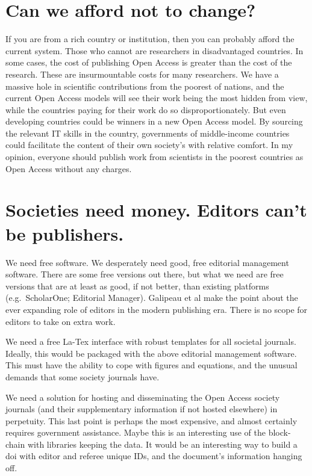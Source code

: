 \documentclass[
]{krantz}
\begin{document}
\hypertarget{can-we-afford-not-to-change}{%
\section{Can we afford not to change?}\label{can-we-afford-not-to-change}}

If you are from a rich country or institution, then you can probably afford the current system. Those who cannot are researchers in disadvantaged countries. In some cases, the cost of publishing Open Access is greater than the cost of the research. These are insurmountable costs for many researchers. We have a massive hole in scientific contributions from the poorest of nations, and the current Open Access models will see their work being the most hidden from view, while the countries paying for their work do so disproportionately. But even developing countries could be winners in a new Open Access model. By sourcing the relevant IT skills in the country, governments of middle-income countries could facilitate the content of their own society's with relative comfort. In my opinion, everyone should publish work from scientists in the poorest countries as Open Access without any charges.

\hypertarget{societies-need-money.-editors-cant-be-publishers.}{%
\section{Societies need money. Editors can't be publishers.}\label{societies-need-money.-editors-cant-be-publishers.}}

We need free software. We desperately need good, free editorial management software. There are some free versions out there, but what we need are free versions that are at least as good, if not better, than existing platforms (e.g.~ScholarOne; Editorial Manager). Galipeau et al \citeyearpar{galipeau2016scoping} make the point about the ever expanding role of editors in the modern publishing era. There is no scope for editors to take on extra work.

We need a free La-Tex interface with robust templates for all societal journals. Ideally, this would be packaged with the above editorial management software. This must have the ability to cope with figures and equations, and the unusual demands that some society journals have.

We need a solution for hosting and disseminating the Open Access society journals (and their supplementary information if not hosted elsewhere) in perpetuity. This last point is perhaps the most expensive, and almost certainly requires government assistance. Maybe this is an interesting use of the block-chain with libraries keeping the data. It would be an interesting way to build a doi with editor and referee unique IDs, and the document's information hanging off.
\end{document}
